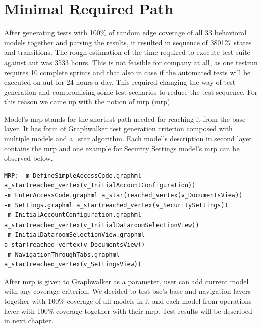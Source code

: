 
\section{Minimal Required Path}
\par
After generating tests with 100\% of random edge coverage of all 33 behavioral models together and parsing the results, it resulted in sequence of 380127 states and transitions. The rough estimation of the time required to execute test suite against \acrshort{aut} was 3533 hours. This is not feasible for company at all, as one testrun requires 10 complete sprints and that also in case if the automated tests will be executed on \acrshort{aut} for 24 hours a day. This required changing the way of test generation and compromising some test scenarios to reduce the test sequence. For this reason we came up with the notion of \acrlong{mrp} (\acrshort{mrp}).

\par
Model's \acrshort{mrp} stands for the shortest path needed for reaching it from the base layer. It has form of Graphwalker test generation criterion composed with multiple models and a\_star algorithm. Each model's description in second layer contains the \acrshort{mrp} and one example for Security Settings model's \acrshort{mrp} can be observed below.

\begin{lstlisting}
MRP: -m DefineSimpleAccessCode.graphml 
a_star(reached_vertex(v_InitialAccountConfiguration))
-m EnterAccessCode.graphml a_star(reached_vertex(v_DocumentsView))
-m Settings.graphml a_star(reached_vertex(v_SecuritySettings))
-m InitialAccountConfiguration.graphml 
a_star(reached_vertex(v_InitialDataroomSelectionView))
-m InitialDataroomSelectionView.graphml a_star(reached_vertex(v_DocumentsView)) 
-m NavigationThroughTabs.graphml a_star(reached_vertex(v_SettingsView))
\end{lstlisting}

After \acrshort{mrp} is given to Graphwalker as a parameter, user can add current model with any coverage criterion. We decided to test \acrshort{bsc}'s base and navigation layers together with 100\% coverage of all models in it and each model from operations layer with 100\% coverage together with their \acrshort{mrp}. Test results will be described in next chapter.

